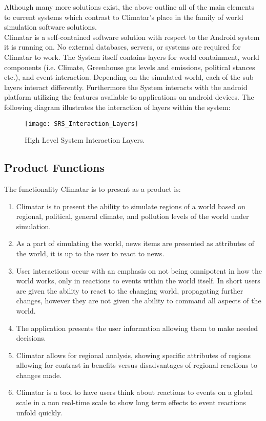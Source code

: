 \documentclass[]{article}
\begin{document}
Although many more solutions exist, the above outline all of the main elements to current systems which contrast to Climatar's place in the family of world simulation software solutions.\\

Climatar is a self-contained software solution with respect to the Android system it is running on. No external databases, servers, or systems are required for Climatar to work. The System itself contains layers for world containment, world components (i.e. Climate, Greenhouse gas levels and emissions, political stances etc.), and event interaction. Depending on the simulated world, each of the sub layers interact differently. Furthermore the System interacts with the android platform utilizing the features available to applications on android devices. The following diagram illustrates the interaction of layers within the system:
\begin{figure}[h]
  \centering
  \texttt{[image: SRS\_Interaction\_Layers]}
  \caption{High Level System Interaction Layers.}
\end{figure}
\newpage

\subsection{Product Functions}
\label{sub:product_functions}
The functionality Climatar is to present as a product is:
\begin{enumerate}
	\item Climatar is to present the ability to simulate regions of a world based on regional, political, general climate, and pollution levels of the world under simulation.
	\item As a part of simulating the world, news items are presented as attributes of the world, it is up to the user to react to news.
	\item User interactions occur with an emphasis on not being omnipotent in how the world works, only in reactions to events within the world itself. In short users are given the ability to react to the changing world, propagating further changes, however they are not given the ability to command all aspects of the world.
	\item The application presents the user information allowing them to make needed decisions.
	\item Climatar allows for regional analysis, showing specific attributes of regions allowing for contrast in benefits versus disadvantages of regional reactions to changes made.
	\item Climatar is a tool to have users think about reactions to events on a global scale in a non real-time scale to show long term effects to event reactions unfold quickly.
\end{enumerate}
\end{document}
